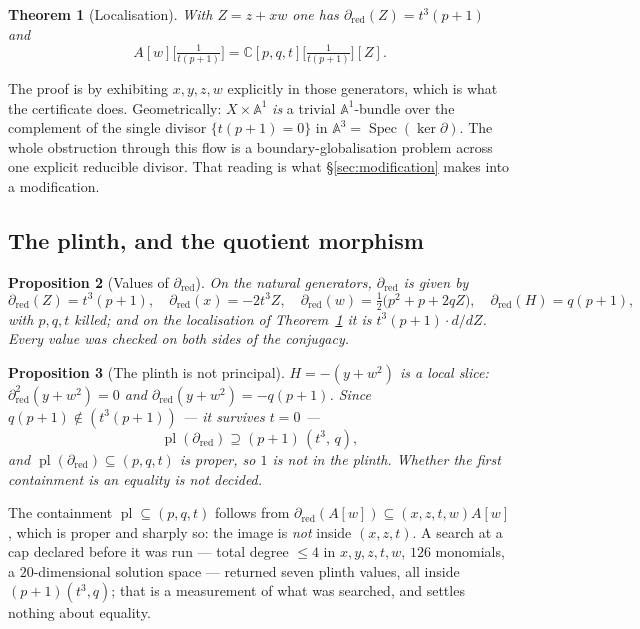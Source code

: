 \documentclass[11pt]{article}
\newtheorem{theorem}{Theorem}[section]
\newtheorem{proposition}[theorem]{Proposition}
\theoremstyle{definition}
\theoremstyle{remark}
\newcommand{\C}{\mathbb{C}}
\newcommand{\Aff}[1]{\mathbb{A}^{#1}}
\newcommand{\pl}{\operatorname{pl}}
\newcommand{\Spec}{\operatorname{Spec}}
\begin{document}
\begin{theorem}[Localisation]\label{thm:localisation}
With $Z=z+xw$ one has $\partial_{\mathrm{red}}(Z)=t^3(p+1)$ and
\[
A[w]\bigl[\tfrac{1}{t(p+1)}\bigr]
= \C[p,q,t]\bigl[\tfrac{1}{t(p+1)}\bigr][Z].
\]
\end{theorem}

The proof is by exhibiting $x,y,z,w$ explicitly in those generators, which is
what the certificate does. Geometrically: $X\times\Aff{1}$ \emph{is} a trivial
$\Aff{1}$-bundle over the complement of the single divisor $\{t(p+1)=0\}$ in
$\Aff{3}=\Spec(\ker\partial)$. The whole obstruction through this flow is a
boundary-globalisation problem across one explicit reducible divisor. That
reading is what \S\ref{sec:modification} makes into a modification.

\subsection{The plinth, and the quotient morphism}

\begin{proposition}[Values of $\partial_{\mathrm{red}}$]\label{prop:values}
On the natural generators, $\partial_{\mathrm{red}}$ is given by
\[
\partial_{\mathrm{red}}(Z)=t^3(p+1),\quad
\partial_{\mathrm{red}}(x)=-2t^3Z,\quad
\partial_{\mathrm{red}}(w)=\tfrac12\bigl(p^2+p+2qZ\bigr),\quad
\partial_{\mathrm{red}}(H)=q(p+1),
\]
with $p,q,t$ killed; and on the localisation of Theorem~\ref{thm:localisation}
it is $t^3(p+1)\cdot d/dZ$. Every value was checked on both sides of the
conjugacy.
\end{proposition}

\begin{proposition}[The plinth is not principal]\label{prop:plinth}
$H=-(y+w^2)$ is a local slice: $\partial_{\mathrm{red}}^2(y+w^2)=0$ and
$\partial_{\mathrm{red}}(y+w^2)=-q(p+1)$. Since $q(p+1)\notin(t^3(p+1))$ ---
it survives $t=0$ ---
\[
\pl(\partial_{\mathrm{red}})\supseteq (p+1)\,(t^3,\,q),
\]
and $\pl(\partial_{\mathrm{red}})\subseteq(p,q,t)$ is proper, so $1$ is not in
the plinth. Whether the first containment is an equality is not decided.
\end{proposition}

The containment $\pl\subseteq(p,q,t)$ follows from
$\partial_{\mathrm{red}}(A[w])\subseteq(x,z,t,w)A[w]$, which is proper and
sharply so: the image is \emph{not} inside $(x,z,t)$. A search at a cap
declared before it was run --- total degree $\le4$ in $x,y,z,t,w$, $126$
monomials, a $20$-dimensional solution space --- returned seven plinth values,
all inside $(p+1)(t^3,q)$; that is a measurement of what was searched, and
settles nothing about equality.
\end{document}
